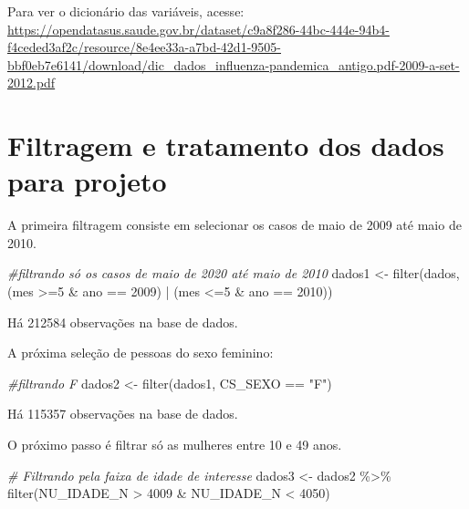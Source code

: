 \documentclass[
]{article}
\newenvironment{Shaded}{\begin{snugshade}}{\end{snugshade}}
\newcommand{\CommentTok}[1]{\textcolor[rgb]{0.56,0.35,0.01}{\textit{#1}}}
\newcommand{\DecValTok}[1]{\textcolor[rgb]{0.00,0.00,0.81}{#1}}
\newcommand{\FunctionTok}[1]{\textcolor[rgb]{0.00,0.00,0.00}{#1}}
\newcommand{\NormalTok}[1]{#1}
\newcommand{\OtherTok}[1]{\textcolor[rgb]{0.56,0.35,0.01}{#1}}
\newcommand{\SpecialCharTok}[1]{\textcolor[rgb]{0.00,0.00,0.00}{#1}}
\newcommand{\StringTok}[1]{\textcolor[rgb]{0.31,0.60,0.02}{#1}}
\begin{document}
Para ver o dicionário das variáveis, acesse:
\url{https://opendatasus.saude.gov.br/dataset/c9a8f286-44bc-444e-94b4-f4ceded3af2c/resource/8e4ee33a-a7bd-42d1-9505-bbf0eb7e6141/download/dic_dados_influenza-pandemica_antigo.pdf-2009-a-set-2012.pdf}

\hypertarget{filtragem-e-tratamento-dos-dados-para-projeto}{%
\section{Filtragem e tratamento dos dados para
projeto}\label{filtragem-e-tratamento-dos-dados-para-projeto}}

A primeira filtragem consiste em selecionar os casos de maio de 2009 até
maio de 2010.

\begin{Shaded}
\begin{Highlighting}[]
\CommentTok{\#filtrando só os casos de maio de 2020 até maio de 2010}
\NormalTok{dados1 }\OtherTok{\textless{}{-}} \FunctionTok{filter}\NormalTok{(dados, }
\NormalTok{                 (mes }\SpecialCharTok{\textgreater{}=}\DecValTok{5} \SpecialCharTok{\&}\NormalTok{ ano }\SpecialCharTok{==} \DecValTok{2009}\NormalTok{) }\SpecialCharTok{|}\NormalTok{ (mes }\SpecialCharTok{\textless{}=}\DecValTok{5} \SpecialCharTok{\&}\NormalTok{ ano }\SpecialCharTok{==} \DecValTok{2010}\NormalTok{))}
\end{Highlighting}
\end{Shaded}

Há 212584 observações na base de dados.

A próxima seleção de pessoas do sexo feminino:

\begin{Shaded}
\begin{Highlighting}[]
\CommentTok{\#filtrando F}
\NormalTok{dados2 }\OtherTok{\textless{}{-}} \FunctionTok{filter}\NormalTok{(dados1, CS\_SEXO }\SpecialCharTok{==} \StringTok{"F"}\NormalTok{)}
\end{Highlighting}
\end{Shaded}

Há 115357 observações na base de dados.

O próximo passo é filtrar só as mulheres entre 10 e 49 anos.

\begin{Shaded}
\begin{Highlighting}[]
\CommentTok{\# Filtrando pela faixa de idade de interesse}
\NormalTok{dados3 }\OtherTok{\textless{}{-}}\NormalTok{ dados2 }\SpecialCharTok{\%\textgreater{}\%} 
  \FunctionTok{filter}\NormalTok{(NU\_IDADE\_N }\SpecialCharTok{\textgreater{}} \DecValTok{4009} \SpecialCharTok{\&}\NormalTok{ NU\_IDADE\_N }\SpecialCharTok{\textless{}} \DecValTok{4050}\NormalTok{)}
\end{Highlighting}
\end{Shaded}
\end{document}
